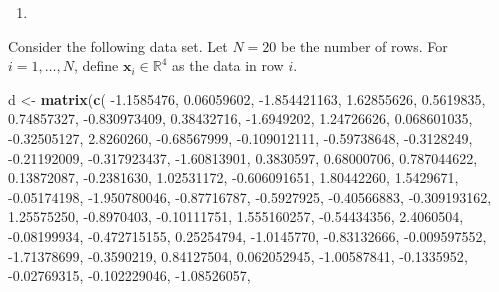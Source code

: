 \documentclass[12pt,krantz2]{krantz}
\makeatletter
\newenvironment{Shaded}{\begin{snugshade}}{\end{snugshade}}
\newcommand{\FloatTok}[1]{\textcolor[rgb]{0.06,0.06,0.06}{#1}}
\newcommand{\KeywordTok}[1]{\textcolor[rgb]{0.27,0.27,0.27}{\textbf{#1}}}
\newcommand{\NormalTok}[1]{#1}
\newcommand{\StringTok}[1]{\textcolor[rgb]{0.5,0.5,0.5}{#1}}
\newenvironment{kframe}{%
\medskip{}
\setlength{\fboxsep}{.8em}
 \def\at@end@of@kframe{}%
 \ifinner\ifhmode%
  \def\at@end@of@kframe{\end{minipage}}%
  \begin{minipage}{\columnwidth}%
 \fi\fi%
 \def\FrameCommand##1{\hskip\@totalleftmargin \hskip-\fboxsep
 \colorbox{shadecolor}{##1}\hskip-\fboxsep
     \hskip-\linewidth \hskip-\@totalleftmargin \hskip\columnwidth}%
 \MakeFramed {\advance\hsize-\width
   \@totalleftmargin\z@ \linewidth\hsize
   \@setminipage}}%
 {\par\unskip\endMakeFramed%
 \at@end@of@kframe}
\renewenvironment{Shaded}{\begin{kframe}}{\end{kframe}}
\makeatother
\begin{document}
\begin{enumerate}
\def\labelenumi{\arabic{enumi}.}
\item
\end{enumerate}

Consider the following data set. Let \(N = 20\) be the number of rows. For \(i=1,\ldots,N\), define \(\mathbf{x}_i \in \mathbb{R}^4\) as the data in row \(i\).

\begin{Shaded}
\begin{Highlighting}[]
\NormalTok{d <-}\StringTok{ }\KeywordTok{matrix}\NormalTok{(}\KeywordTok{c}\NormalTok{(}
  \FloatTok{-1.1585476}\NormalTok{,  }\FloatTok{0.06059602}\NormalTok{, }\FloatTok{-1.854421163}\NormalTok{,  }\FloatTok{1.62855626}\NormalTok{,}
  \FloatTok{0.5619835}\NormalTok{,  }\FloatTok{0.74857327}\NormalTok{, }\FloatTok{-0.830973409}\NormalTok{,  }\FloatTok{0.38432716}\NormalTok{,}
  \FloatTok{-1.6949202}\NormalTok{,  }\FloatTok{1.24726626}\NormalTok{,  }\FloatTok{0.068601035}\NormalTok{, }\FloatTok{-0.32505127}\NormalTok{,}
  \FloatTok{2.8260260}\NormalTok{, }\FloatTok{-0.68567999}\NormalTok{, }\FloatTok{-0.109012111}\NormalTok{, }\FloatTok{-0.59738648}\NormalTok{,}
  \FloatTok{-0.3128249}\NormalTok{, }\FloatTok{-0.21192009}\NormalTok{, }\FloatTok{-0.317923437}\NormalTok{, }\FloatTok{-1.60813901}\NormalTok{,}
  \FloatTok{0.3830597}\NormalTok{,  }\FloatTok{0.68000706}\NormalTok{,  }\FloatTok{0.787044622}\NormalTok{,  }\FloatTok{0.13872087}\NormalTok{,}
  \FloatTok{-0.2381630}\NormalTok{,  }\FloatTok{1.02531172}\NormalTok{, }\FloatTok{-0.606091651}\NormalTok{,  }\FloatTok{1.80442260}\NormalTok{,}
  \FloatTok{1.5429671}\NormalTok{, }\FloatTok{-0.05174198}\NormalTok{, }\FloatTok{-1.950780046}\NormalTok{, }\FloatTok{-0.87716787}\NormalTok{,}
  \FloatTok{-0.5927925}\NormalTok{, }\FloatTok{-0.40566883}\NormalTok{, }\FloatTok{-0.309193162}\NormalTok{,  }\FloatTok{1.25575250}\NormalTok{,}
  \FloatTok{-0.8970403}\NormalTok{, }\FloatTok{-0.10111751}\NormalTok{,  }\FloatTok{1.555160257}\NormalTok{, }\FloatTok{-0.54434356}\NormalTok{,}
  \FloatTok{2.4060504}\NormalTok{, }\FloatTok{-0.08199934}\NormalTok{, }\FloatTok{-0.472715155}\NormalTok{,  }\FloatTok{0.25254794}\NormalTok{,}
  \FloatTok{-1.0145770}\NormalTok{, }\FloatTok{-0.83132666}\NormalTok{, }\FloatTok{-0.009597552}\NormalTok{, }\FloatTok{-1.71378699}\NormalTok{,}
  \FloatTok{-0.3590219}\NormalTok{,  }\FloatTok{0.84127504}\NormalTok{,  }\FloatTok{0.062052945}\NormalTok{, }\FloatTok{-1.00587841}\NormalTok{,}
  \FloatTok{-0.1335952}\NormalTok{, }\FloatTok{-0.02769315}\NormalTok{, }\FloatTok{-0.102229046}\NormalTok{, }\FloatTok{-1.08526057}\NormalTok{,}

\end{Highlighting}
\end{Shaded}
\end{document}
